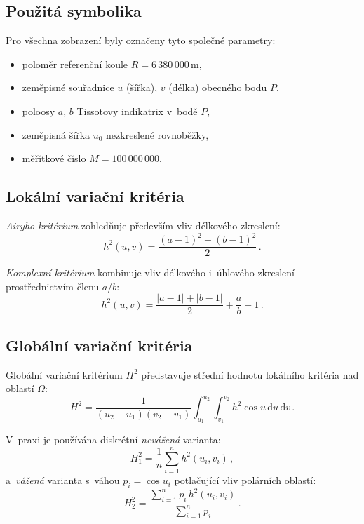 \documentclass[11pt, a4paper]{article}
\begin{document}
\subsection{Použitá symbolika}

Pro všechna zobrazení byly označeny tyto společné parametry:
\begin{itemize}
    \item poloměr referenční koule $R = 6\,380\,000$\,m,
    \item zeměpisné souřadnice $u$ (šířka), $v$ (délka) obecného bodu $P$,
    \item poloosy $a$, $b$ Tissotovy indikatrix v~bodě $P$,
    \item zeměpisná šířka $u_0$ nezkreslené rovnoběžky,
    \item měřítkové číslo $M = 100\,000\,000$.
\end{itemize}

\subsection{Lokální variační kritéria}

\textit{Airyho kritérium} zohledňuje především vliv délkového zkreslení:
\begin{equation}
    h^2(u,v) = \frac{(a-1)^2 + (b-1)^2}{2}\,.
\end{equation}

\textit{Komplexní kritérium} kombinuje vliv délkového i~úhlového zkreslení prostřednictvím členu $a/b$:
\begin{equation}
    h^2(u,v) = \frac{|a-1|+|b-1|}{2} + \frac{a}{b} - 1\,.
\end{equation}

\subsection{Globální variační kritéria}

Globální variační kritérium $H^2$ představuje střední hodnotu lokálního kritéria nad oblastí $\Omega$:
\begin{equation}
    H^2 = \frac{1}{(u_2 - u_1)(v_2 - v_1)} \int_{u_1}^{u_2}\int_{v_1}^{v_2} h^2 \cos u\, \mathrm{d}u\,\mathrm{d}v\,.
\end{equation}

V~praxi je používána diskrétní \textit{nevážená} varianta:
\begin{equation}
    H_1^2 = \frac{1}{n}\sum_{i=1}^{n} h^2(u_i, v_i)\,,
\end{equation}
a~\textit{vážená} varianta s~váhou $p_i = \cos u_i$ potlačující vliv polárních oblastí:
\begin{equation}
    H_2^2 = \frac{\sum_{i=1}^{n} p_i\, h^2(u_i, v_i)}{\sum_{i=1}^{n} p_i}\,.
\end{equation}
\end{document}
